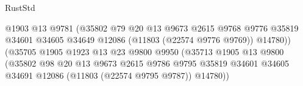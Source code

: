 \begin{lexlean}{RustStd}
\begin{coremodule}
                                                  @1903
                                                  @13
                                                  @9781
                                                  (@35802
                                                    @79
                                                    @20
                                                    @13
                                                    @9673
                                                    @2615
                                                    @9768
                                                    @9776
                                                    @35819
                                                    @34601
                                                    @34605
                                                    @34649
                                                    @12086
                                                    (@11803 (@22574 @9776 @9769))
                                                    @14780))
                                                (@35705
                                                  @1905
                                                  @1923
                                                  @13
                                                  @23
                                                  @9800
                                                  @9950
                                                  (@35713
                                                    @1905
                                                    @13
                                                    @9800
                                                    (@35802
                                                      @98
                                                      @20
                                                      @13
                                                      @9673
                                                      @2615
                                                      @9786
                                                      @9795
                                                      @35819
                                                      @34601
                                                      @34605
                                                      @34691
                                                      @12086
                                                      (@11803 (@22574 @9795 @9787))
                                                      @14780))

\end{coremodule}
\end{lexlean}
